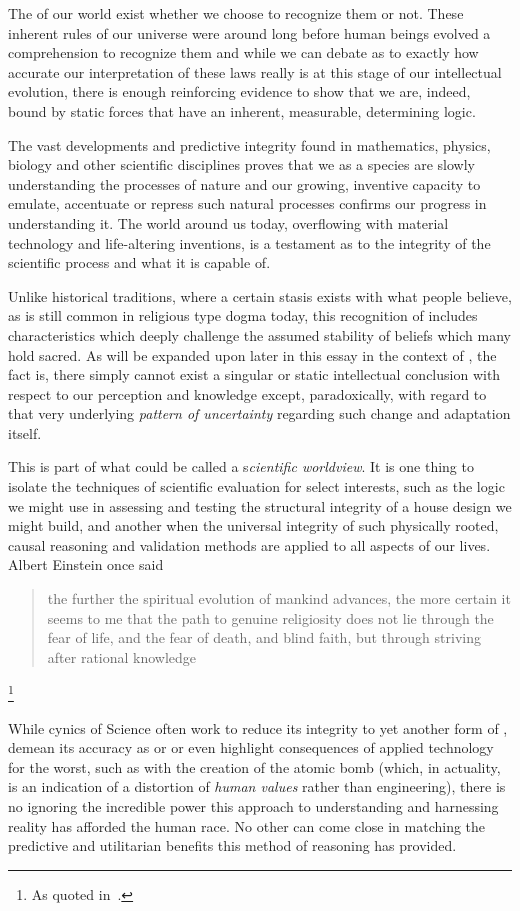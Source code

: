\documentclass[10pt, a4paper, cleardoubleempty, openright, twoside]{book}
\begin{document}
The  of our world exist whether we choose to
recognize them or not. These inherent rules of our universe were around
long before human beings evolved a comprehension to recognize them and
while we can debate as to exactly how accurate our interpretation of
these laws really is at this stage of our intellectual evolution,
there is enough reinforcing evidence to show that we are, indeed,
bound by static forces that have an inherent, measurable, determining
logic.

The vast developments and predictive integrity found in mathematics,
physics, biology and other scientific disciplines proves that we as a
species are slowly understanding the processes of nature and our
growing, inventive capacity to emulate, accentuate or repress such
natural processes confirms our progress in understanding it. The world
around us today, overflowing with material technology and life-altering
inventions, is a testament as to the integrity of the scientific process
and what it is capable of.

Unlike historical traditions, where a certain stasis exists with what
people believe, as is still common in religious type dogma today, this
recognition of  includes characteristics which deeply
challenge the assumed stability of beliefs which many hold sacred. As
will be expanded upon later in this essay in the context of ,
the fact is, there simply cannot exist a singular or static intellectual
conclusion with respect to our perception and knowledge except,
paradoxically, with regard to that very underlying \emph{pattern of
uncertainty} regarding such change and adaptation itself.

This is part of what could be called a s\emph{cientific worldview}. It
is one thing to isolate the techniques of scientific evaluation for
select interests, such as the logic we might use in assessing and
testing the structural integrity of a house design we might build, and
another when the universal integrity of such physically rooted, causal
reasoning and validation methods are applied to all aspects of our
lives. Albert Einstein once said \blockquote{the further the spiritual
evolution of mankind advances, the more certain it seems to me that the
path to genuine religiosity does not lie through the fear of life, and
the fear of death, and blind faith, but through striving after rational
knowledge}.\footnote{
	As quoted in~\cite{Murray::86}.
}

While cynics of Science often work to reduce its integrity to yet
another form of , demean its accuracy as
 or  or even highlight
consequences of applied technology for the worst, such as with the
creation of the atomic bomb (which, in actuality, is an indication of a
distortion of \emph{human values} rather than engineering), there is no
ignoring the incredible power this approach to understanding and
harnessing reality has afforded the human race. No other
 can come close in matching the predictive and
utilitarian benefits this method of reasoning has provided.
\end{document}

